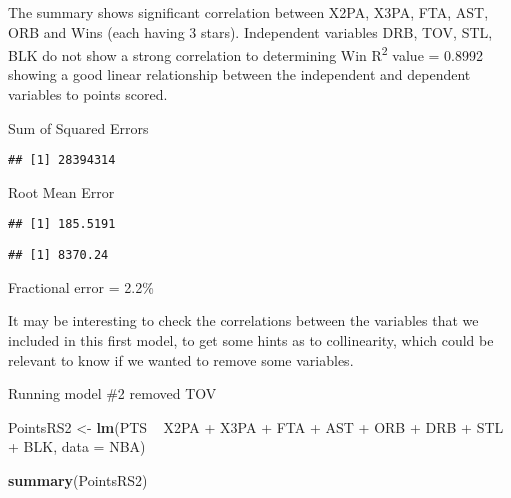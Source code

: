 \documentclass[]{article}
\newenvironment{Shaded}{\begin{snugshade}}{\end{snugshade}}
\newcommand{\KeywordTok}[1]{\textcolor[rgb]{0.13,0.29,0.53}{\textbf{{#1}}}}
\newcommand{\DataTypeTok}[1]{\textcolor[rgb]{0.13,0.29,0.53}{{#1}}}
\newcommand{\DecValTok}[1]{\textcolor[rgb]{0.00,0.00,0.81}{{#1}}}
\newcommand{\StringTok}[1]{\textcolor[rgb]{0.31,0.60,0.02}{{#1}}}
\newcommand{\NormalTok}[1]{{#1}}
\begin{document}
The summary shows significant correlation between X2PA, X3PA, FTA, AST,
ORB and Wins (each having 3 stars). Independent variables DRB, TOV, STL,
BLK do not show a strong correlation to determining Win
R\textsuperscript{2} value = 0.8992 showing a good linear relationship
between the independent and dependent variables to points scored.

Sum of Squared Errors

\begin{Shaded}
\end{Shaded}

\begin{verbatim}
## [1] 28394314
\end{verbatim}

Root Mean Error

\begin{Shaded}
\end{Shaded}

\begin{verbatim}
## [1] 185.5191
\end{verbatim}

\begin{Shaded}
\end{Shaded}

\begin{verbatim}
## [1] 8370.24
\end{verbatim}

Fractional error = 2.2\%

It may be interesting to check the correlations between the variables
that we included in this first model, to get some hints as to
collinearity, which could be relevant to know if we wanted to remove
some variables.

Running model \#2 removed TOV

\begin{Shaded}
\begin{Highlighting}[]
\NormalTok{PointsRS2 <-}\StringTok{ }\KeywordTok{lm}\NormalTok{(PTS ~}\StringTok{ }\NormalTok{X2PA +}\StringTok{ }\NormalTok{X3PA +}\StringTok{ }\NormalTok{FTA +}\StringTok{ }\NormalTok{AST +}\StringTok{ }\NormalTok{ORB +}\StringTok{ }\NormalTok{DRB +}\StringTok{ }\NormalTok{STL +}\StringTok{ }\NormalTok{BLK, }\DataTypeTok{data =} \NormalTok{NBA)}

\KeywordTok{summary}\NormalTok{(PointsRS2)}
\end{Highlighting}
\end{Shaded}
\end{document}

